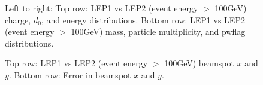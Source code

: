 \begin{figure}[H]
\hfill
\caption{Left to right: Top row: LEP1 vs LEP2 (event energy $>$ 100GeV) charge, $d_0$, and energy distributions. Bottom row: LEP1 vs LEP2 (event energy $>$ 100GeV) mass, particle multiplicity, and pwflag distributions.}
\end{figure}

\begin{figure}[H]
\centering
{}\hfill
{}\hfill %
\hfill
{}\hfill
\caption{Top row: LEP1 vs LEP2 (event energy $>$ 100GeV) beamspot $x$ and $y$. Bottom row: Error in beamspot $x$ and $y$.}
\end{figure}

